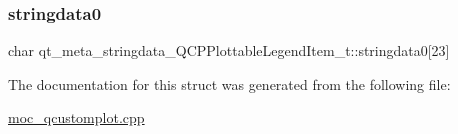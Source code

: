 \subsubsection{\texorpdfstring{stringdata0}{stringdata0}}
{\footnotesize\ttfamily char qt\+\_\+meta\+\_\+stringdata\+\_\+\+Q\+C\+P\+Plottable\+Legend\+Item\+\_\+t\+::stringdata0\mbox{[}23\mbox{]}}



The documentation for this struct was generated from the following file\+:\begin{DoxyCompactItemize}
\item 
\mbox{\hyperlink{moc__qcustomplot_8cpp}{moc\+\_\+qcustomplot.\+cpp}}\end{DoxyCompactItemize}
